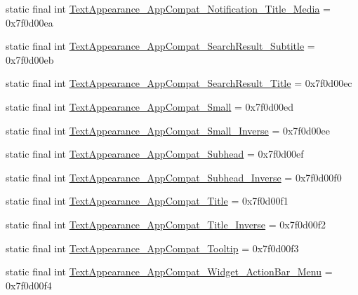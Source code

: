 \begin{DoxyCompactItemize}
\item 
static final int \mbox{\hyperlink{classandroid_1_1support_1_1design_1_1R_1_1style_a94e4f19f08e8e04a18ede2086892c7d4}{Text\+Appearance\+\_\+\+App\+Compat\+\_\+\+Notification\+\_\+\+Title\+\_\+\+Media}} = 0x7f0d00ea
\item 
static final int \mbox{\hyperlink{classandroid_1_1support_1_1design_1_1R_1_1style_aa74ef0db689e7a9ca4d8eb5bb6ddb39f}{Text\+Appearance\+\_\+\+App\+Compat\+\_\+\+Search\+Result\+\_\+\+Subtitle}} = 0x7f0d00eb
\item 
static final int \mbox{\hyperlink{classandroid_1_1support_1_1design_1_1R_1_1style_ac1981951ceed0b51f02c35a709d05b59}{Text\+Appearance\+\_\+\+App\+Compat\+\_\+\+Search\+Result\+\_\+\+Title}} = 0x7f0d00ec
\item 
static final int \mbox{\hyperlink{classandroid_1_1support_1_1design_1_1R_1_1style_ad01c4cdfcd6c9c59bf080f594be9a5fe}{Text\+Appearance\+\_\+\+App\+Compat\+\_\+\+Small}} = 0x7f0d00ed
\item 
static final int \mbox{\hyperlink{classandroid_1_1support_1_1design_1_1R_1_1style_a51c0b2630a053741b47b8c2809e85733}{Text\+Appearance\+\_\+\+App\+Compat\+\_\+\+Small\+\_\+\+Inverse}} = 0x7f0d00ee
\item 
static final int \mbox{\hyperlink{classandroid_1_1support_1_1design_1_1R_1_1style_aacedc78f0110a92c2c299c22125f3ef5}{Text\+Appearance\+\_\+\+App\+Compat\+\_\+\+Subhead}} = 0x7f0d00ef
\item 
static final int \mbox{\hyperlink{classandroid_1_1support_1_1design_1_1R_1_1style_a09683f1d91752d44db1f8c8be6d4d501}{Text\+Appearance\+\_\+\+App\+Compat\+\_\+\+Subhead\+\_\+\+Inverse}} = 0x7f0d00f0
\item 
static final int \mbox{\hyperlink{classandroid_1_1support_1_1design_1_1R_1_1style_ad05526165d88021b2df0f8928fc2ee6d}{Text\+Appearance\+\_\+\+App\+Compat\+\_\+\+Title}} = 0x7f0d00f1
\item 
static final int \mbox{\hyperlink{classandroid_1_1support_1_1design_1_1R_1_1style_a8f9745ee1bf804c7d2e699cc8c9816d7}{Text\+Appearance\+\_\+\+App\+Compat\+\_\+\+Title\+\_\+\+Inverse}} = 0x7f0d00f2
\item 
static final int \mbox{\hyperlink{classandroid_1_1support_1_1design_1_1R_1_1style_a3854c9afaabc2eb17e3e636d10324e85}{Text\+Appearance\+\_\+\+App\+Compat\+\_\+\+Tooltip}} = 0x7f0d00f3
\item 
static final int \mbox{\hyperlink{classandroid_1_1support_1_1design_1_1R_1_1style_a86a5d5ff68181041becf5bb70064877c}{Text\+Appearance\+\_\+\+App\+Compat\+\_\+\+Widget\+\_\+\+Action\+Bar\+\_\+\+Menu}} = 0x7f0d00f4

\end{DoxyCompactItemize}
